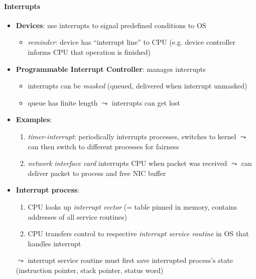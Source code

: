 \paragraph{Interrupts}
\begin{itemize}
	\item \textbf{Devices}: use interrupts to signal predefined conditions to OS
	\begin{itemize}
		\item \emph{reminder}: device has ``interrupt line'' to CPU (e.g. device controller informs CPU that operation is finished)
	\end{itemize}
	\item \textbf{Programmable Interrupt Controller}: manages interrupts
	\begin{itemize}
		\item interrupts can be \emph{masked} (queued, delivered when interrupt unmasked)
		\item queue has finite length $ \leadsto $ interrupts can get lost
	\end{itemize}
	\item \textbf{Examples}:
	\begin{enumerate}
		\item \emph{timer-interrupt}: periodically interrupts processes, switches to kernel $ \leadsto $ can then switch to different processes for fairness
		\item \emph{network interface card} interrupts CPU when packet was received $ \leadsto $ can deliver packet to process and free NIC buffer
	\end{enumerate}
	\item \textbf{Interrupt process}:
	\begin{enumerate}
		\item CPU looks up \emph{interrupt vector} (= table pinned in memory, contains addresses of all service routines)
		\item CPU transfers control to respective \emph{interrupt service routine} in OS that handles interrupt
	\end{enumerate}
	$ \leadsto $ interrupt service routine must first save interrupted process's state (instruction pointer, stack pointer, status word)
\end{itemize}

